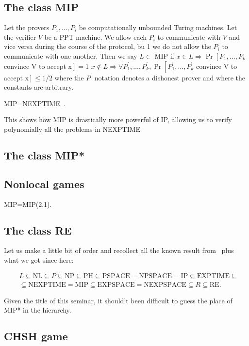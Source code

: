 \subsection{The class MIP}

\begin{defn}
    Let the provers $P_{1}, \ldots, P_{i}$ be computationally unbounded Turing machines. Let the verifier $V$ be a PPT machine. We allow each $P_{i}$ to communicate with $V$ and vice versa during the course of the protocol, bu
    1
    we do not allow the $P_{i}$ to communicate with one another. Then we say $L \in$ MIP if $x \in L \Longrightarrow \operatorname{Pr}\left[P_{1}, \ldots, P_{k}\right.$ convince $\mathrm{V}$ to accept $\left.\mathrm{x}\right]=1$
    $x \notin L \Longrightarrow \forall P_{1}^{\prime}, \ldots, P_{k}^{\prime}, \operatorname{Pr}\left[P_{1}^{\prime}, \ldots, P_{k}^{\prime}\right.$ convince $\mathrm{V}$ to accept $\left.\mathrm{x}\right] \leq 1 / 2$
    where the $P^{\prime}$ notation denotes a dishonest prover and where the constants are arbitrary.
\end{defn}

\begin{theorem}
MIP=NEXPTIME~\cite{topicsin}.
\end{theorem}

This shows how MIP is drastically more powerful of IP, allowing us to verify polynomially all the problems in NEXPTIME


\subsection{The class MIP*}


\subsection{Nonlocal games}

\begin{theorem}
MIP=MIP(2,1).
\end{theorem}
\subsection{The class RE}


Let us make a little bit of order and recollect all the known result from~\cite{papadimitriou1994computational} plus what we got since here:

\begin{equation}
\begin{split}
    &L \subseteq \text{NL} \subseteq P \subseteq \text{NP} \subseteq \text{PH} \subseteq \text{PSPACE} = \text{NPSPACE} = \text{IP} \subseteq \text{EXPTIME} \subseteq  \\
    &\subseteq \text{NEXPTIME} = \text{MIP} \subseteq \text{EXPSPACE} = \text{NEXPSPACE} \subseteq R \subseteq \text{RE}.
\end{split}
\end{equation}

Given the title of this seminar, it should't been difficult to guess the place of MIP* in the hierarchy.

\subsection{CHSH game}
